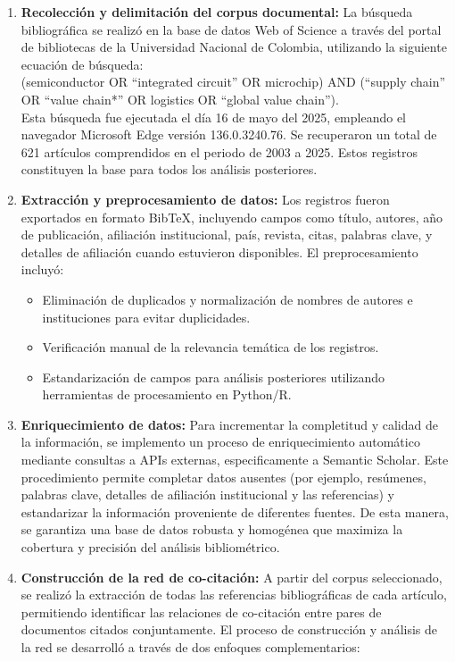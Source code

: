 \documentclass[twoside, twocolumn]{article}
\newcommand{\1}{\mathds{1}}						%
\begin{document}
\begin{enumerate}
    \item \textbf{Recolección y delimitación del corpus documental:} La búsqueda bibliográfica se realizó en la base de datos Web of Science a través del portal de bibliotecas de la Universidad Nacional de Colombia, utilizando la siguiente ecuación de búsqueda:
    \\
    (semiconductor OR ``integrated circuit'' OR microchip) AND (``supply chain'' OR ``value chain*'' OR logistics OR ``global value chain'').
    \\
    Esta búsqueda fue ejecutada el día 16 de mayo del 2025, empleando el navegador Microsoft Edge versión 136.0.3240.76. Se recuperaron un total de 621 artículos comprendidos en el periodo de 2003 a 2025. Estos registros constituyen la base para todos los análisis posteriores.

    \item \textbf{Extracción y preprocesamiento de datos:} Los registros fueron exportados en formato BibTeX, incluyendo campos como título, autores, año de publicación, afiliación institucional, país, revista, citas, palabras clave, y detalles de afiliación cuando estuvieron disponibles. El preprocesamiento incluyó:
    \begin{itemize}
        \item Eliminación de duplicados y normalización de nombres de autores e instituciones para evitar duplicidades.
        \item Verificación manual de la relevancia temática de los registros.
        \item Estandarización de campos para análisis posteriores utilizando herramientas de procesamiento en Python/R.
    \end{itemize}

    \item \textbf{Enriquecimiento de datos:}  Para incrementar la completitud y calidad de la información, se implemento  un proceso de enriquecimiento automático mediante consultas a APIs externas, especificamente a Semantic Scholar.\cite{Kinney2023} Este procedimiento permite completar datos ausentes (por ejemplo, resúmenes, palabras clave, detalles de afiliación institucional y las referencias) y estandarizar la información proveniente de diferentes fuentes. De esta manera, se garantiza una base de datos robusta y homogénea que maximiza la cobertura y precisión del análisis bibliométrico.


    \item \textbf{Construcción de la red de co-citación:}
    A partir del corpus seleccionado, se realizó la extracción de todas las referencias bibliográficas de cada artículo, permitiendo identificar las relaciones de co-citación entre pares de documentos citados conjuntamente. El proceso de construcción y análisis de la red se desarrolló a través de dos enfoques complementarios:


\end{enumerate}
\end{document}
